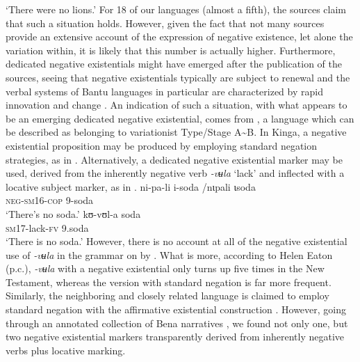\documentclass[output=paper]{langsci/langscibook}
\begin{document}
`There were no lions.' \z\z 
%
For 18
of our languages (almost a fifth), the sources claim that such a situation
holds. However, given the fact that not many sources provide an extensive
account of the expression of negative existence, let alone the variation
within, it is likely that this number is actually higher. Furthermore,
dedicated negative existentials might have emerged after the publication of
the sources, seeing that negative existentials typically are subject to
renewal \citep{Veselinova2016} and the verbal systems of Bantu languages in particular are
characterized by rapid innovation and change \citep[25]{Nurse2008}. An
indication of such a situation, with what appears to be an emerging
dedicated negative existential, comes from , a language which
can be described as belonging to variationist Type\slash Stage
A{\textasciitilde}B. In Kinga, a negative existential proposition may be
produced by employing standard negation strategies, as in
. Alternatively, a dedicated negative existential
marker may be used, derived from the inherently negative verb
\textit{-vʉla} `lack' and inflected with a locative subject marker, as in
.  
%
\ea\label{ex:kinga-soda}  \ea\label{ex:kinga-soda-1} 
\gll ni-pa-li i-soda \op{\textasciitilde}/nɩpali ɩsoda\cp\\ 
\textsc{neg-sm16-cop} \textsc{9-}soda\\
\glt 	`There's no soda.' \ex\label{ex:kinga-soda-2} \gll kʊ{}-vʊl-a
soda\\ \textsc{sm}17-lack-\textsc{fv} 9.soda\\ \glt 	`There is no soda.'
\z\z 
%
However, there is no account at all of the negative existential use of
\textit{-vʉla} in the grammar on  by \citet{Wolff1905}. What is
more, according to Helen Eaton (p.c.), \textit{-vʉla}
with a negative existential only turns up five times in the New Testament,
whereas the version with standard negation is far more frequent. Similarly,
the neighboring and closely related language  is claimed to
employ standard negation with the affirmative existential construction
\citep[378]{Morrison2011}. However, going through an annotated collection
of Bena narratives \citep{Eaton2015a}, we found not only one, but two
negative existential markers transparently derived from inherently negative
verbs plus locative marking.
\end{document}
